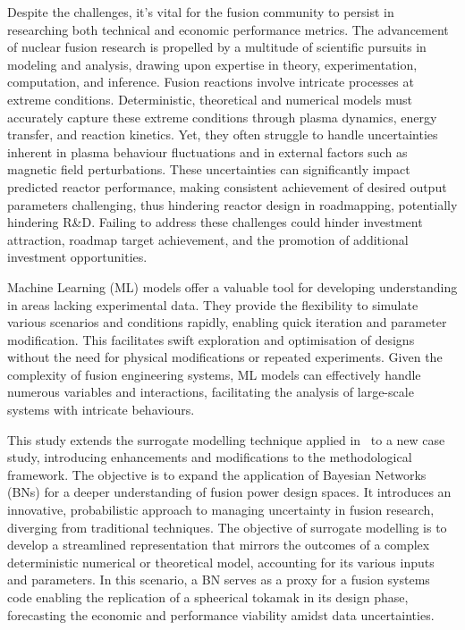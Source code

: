 \documentclass[journal]{IEEEtran}
\begin{document}
Despite the challenges, it's vital for the fusion community to persist in researching both technical and economic performance metrics. The advancement of nuclear fusion research is propelled by a multitude of scientific pursuits in modeling and analysis, drawing upon expertise in theory, experimentation, computation, and inference. Fusion reactions involve intricate processes at extreme conditions. Deterministic, theoretical and numerical models must accurately capture these extreme conditions through plasma dynamics, energy transfer, and reaction kinetics. Yet, they often struggle to handle uncertainties inherent in plasma behaviour fluctuations and in external factors such as magnetic field perturbations. These uncertainties can significantly impact predicted reactor performance, making consistent achievement of desired output parameters challenging, thus hindering reactor design in roadmapping, potentially hindering R\&D. Failing to address these challenges could hinder investment attraction, roadmap target achievement, and the promotion of additional investment opportunities.

Machine Learning (ML) models offer a valuable tool for developing understanding in areas lacking experimental data. They provide the flexibility to simulate various scenarios and conditions rapidly, enabling quick iteration and parameter modification. This facilitates swift exploration and optimisation of designs without the need for physical modifications or repeated experiments. Given the complexity of fusion engineering systems, ML models can effectively handle numerous variables and interactions, facilitating the analysis of large-scale systems with intricate behaviours.

This study extends the surrogate modelling technique applied in~\cite{Griffiths2024} to a new case study, introducing enhancements and modifications to the methodological framework. The objective is to expand the application of Bayesian Networks (BNs) for a deeper understanding of fusion power design spaces. It introduces an innovative, probabilistic approach to managing uncertainty in fusion research, diverging from traditional techniques. The objective of surrogate modelling is to develop a streamlined representation that mirrors the outcomes of a complex deterministic numerical or theoretical model, accounting for its various inputs and parameters. In this scenario, a BN serves as a proxy for a fusion systems code enabling the replication of a spheerical tokamak in its design phase, forecasting the economic and performance viability amidst data uncertainties.
\end{document}
